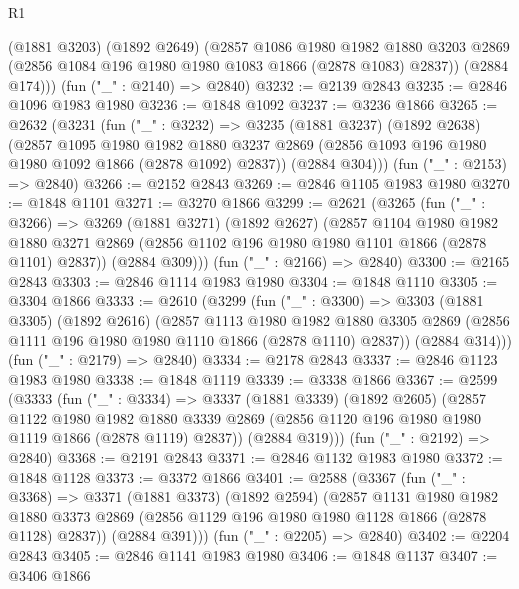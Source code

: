 \begin{lexlean}{R1}
\begin{coremodule}
        (@1881 @3203)
        (@1892 @2649)
        (@2857
          @1086
          @1980
          @1982
          @1880
          @3203
          @2869
          (@2856 @1084 @196 @1980 @1980 @1083 @1866 (@2878 @1083) @2837))
        (@2884 @174)))
    (fun ("_" : @2140) => @2840)
@3232 := @2139 @2843
@3235 := @2846 @1096 @1983 @1980
@3236 := @1848 @1092
@3237 := @3236 @1866
@3265 := @2632
    (@3231
      (fun ("_" : @3232) =>
      @3235
        (@1881 @3237)
        (@1892 @2638)
        (@2857
          @1095
          @1980
          @1982
          @1880
          @3237
          @2869
          (@2856 @1093 @196 @1980 @1980 @1092 @1866 (@2878 @1092) @2837))
        (@2884 @304)))
    (fun ("_" : @2153) => @2840)
@3266 := @2152 @2843
@3269 := @2846 @1105 @1983 @1980
@3270 := @1848 @1101
@3271 := @3270 @1866
@3299 := @2621
    (@3265
      (fun ("_" : @3266) =>
      @3269
        (@1881 @3271)
        (@1892 @2627)
        (@2857
          @1104
          @1980
          @1982
          @1880
          @3271
          @2869
          (@2856 @1102 @196 @1980 @1980 @1101 @1866 (@2878 @1101) @2837))
        (@2884 @309)))
    (fun ("_" : @2166) => @2840)
@3300 := @2165 @2843
@3303 := @2846 @1114 @1983 @1980
@3304 := @1848 @1110
@3305 := @3304 @1866
@3333 := @2610
    (@3299
      (fun ("_" : @3300) =>
      @3303
        (@1881 @3305)
        (@1892 @2616)
        (@2857
          @1113
          @1980
          @1982
          @1880
          @3305
          @2869
          (@2856 @1111 @196 @1980 @1980 @1110 @1866 (@2878 @1110) @2837))
        (@2884 @314)))
    (fun ("_" : @2179) => @2840)
@3334 := @2178 @2843
@3337 := @2846 @1123 @1983 @1980
@3338 := @1848 @1119
@3339 := @3338 @1866
@3367 := @2599
    (@3333
      (fun ("_" : @3334) =>
      @3337
        (@1881 @3339)
        (@1892 @2605)
        (@2857
          @1122
          @1980
          @1982
          @1880
          @3339
          @2869
          (@2856 @1120 @196 @1980 @1980 @1119 @1866 (@2878 @1119) @2837))
        (@2884 @319)))
    (fun ("_" : @2192) => @2840)
@3368 := @2191 @2843
@3371 := @2846 @1132 @1983 @1980
@3372 := @1848 @1128
@3373 := @3372 @1866
@3401 := @2588
    (@3367
      (fun ("_" : @3368) =>
      @3371
        (@1881 @3373)
        (@1892 @2594)
        (@2857
          @1131
          @1980
          @1982
          @1880
          @3373
          @2869
          (@2856 @1129 @196 @1980 @1980 @1128 @1866 (@2878 @1128) @2837))
        (@2884 @391)))
    (fun ("_" : @2205) => @2840)
@3402 := @2204 @2843
@3405 := @2846 @1141 @1983 @1980
@3406 := @1848 @1137
@3407 := @3406 @1866

\end{coremodule}
\end{lexlean}
